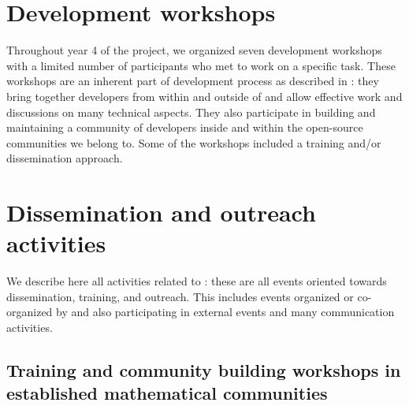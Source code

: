 \documentclass{deliverablereport}
\author{Izabela Faguet, Viviane Pons, Nicolas M. Thiéry et al.}
\begin{document}
\maketitle
\githubissuedescription
\newpage
\tableofcontents
\newpage

\section{Development workshops}

Throughout year 4 of the project, we organized seven development
workshops with a limited number of participants who met to work on a
specific task. These workshops are an inherent part of \ODK
development process as described in :
they bring together developers from within and outside of \ODK and
allow effective work and discussions on many technical aspects. They
also participate in building and maintaining a community of developers
inside \ODK and within the open-source communities we belong to. Some
of the workshops included a training and/or dissemination approach.















\clearpage
\section{Dissemination and outreach activities}

We describe here all activities related to :
these are all events oriented towards dissemination, training, and outreach. This
includes events organized or co-organized by \ODK and also
participating in external events and many communication activities.

\subsection{Training and community building workshops in established mathematical communities}
\end{document}
